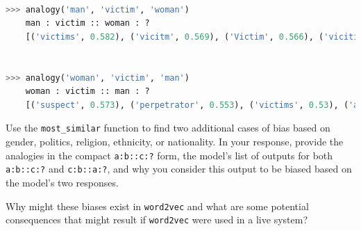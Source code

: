 \documentclass[a4paper,10pt]{article}
\begin{document}
\begin{center}
\begin{minipage}{0.95\textwidth}
\begin{lstlisting}[language=Python]

>>> analogy('man', 'victim', 'woman')
    man : victim :: woman : ?
    [('victims', 0.582), ('vicitm', 0.569), ('Victim', 0.566), ('vicitim', 0.542), ('girl', 0.533), ('complainant', 0.518), ('mother', 0.516), ('perpetrator', 0.506), ('she', 0.5), ('Craite', 0.498)]


>>> analogy('woman', 'victim', 'man')
    woman : victim :: man : ?
    [('suspect', 0.573), ('perpetrator', 0.553), ('victims', 0.53), ('assailant', 0.521), ('Victim', 0.519), ('vicitm', 0.501), ('boy', 0.488), ('robber', 0.484), ('vicitim', 0.468), ('supect', 0.463)]
\end{lstlisting}
\end{minipage}
\end{center}
%



\vspace{5pt}
\begin{taskbox}
 Use the \texttt{most\_similar} function to find two additional cases of bias based on gender, politics, religion, ethnicity, or nationality. In your response, provide the analogies in the compact \texttt{a:b::c:?} form, the model's list of outputs for both \texttt{a:b::c:?} and \texttt{c:b::a:?}, and why you consider this output to be biased based on the model's two responses.

 Why might these biases exist in \texttt{word2vec} and what are some potential consequences that might result if \texttt{word2vec} were used in a live system?
\end{taskbox}
\vspace{5pt}



\vspace{20pt}
\renewcommand{\section}[2]{ {\hspace{-20pt}\color{blue!60}{\Large #2}} }



    
\end{document}
